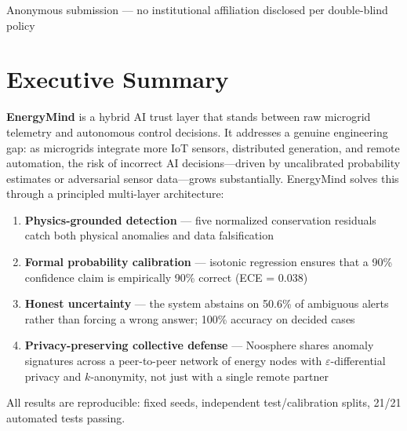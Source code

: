 \documentclass[12pt, a4paper]{article}
\begin{document}
\begin{titlepage}
\vfill
{\small\color{TextDark!50} Anonymous submission — no institutional affiliation disclosed per double-blind policy}
\end{titlepage}

\tableofcontents
\newpage

\section{Executive Summary}

\textbf{EnergyMind} is a hybrid AI trust layer that stands between raw microgrid telemetry and autonomous control decisions. It addresses a genuine engineering gap: as microgrids integrate more IoT sensors, distributed generation, and remote automation, the risk of incorrect AI decisions—driven by uncalibrated probability estimates or adversarial sensor data—grows substantially. EnergyMind solves this through a principled multi-layer architecture:

\begin{enumerate}[leftmargin=*, label=\textbf{\arabic*.}]
  \item \textbf{Physics-grounded detection} — five normalized conservation residuals catch both physical anomalies and data falsification
  \item \textbf{Formal probability calibration} — isotonic regression ensures that a 90\% confidence claim is empirically 90\% correct (ECE = 0.038)
  \item \textbf{Honest uncertainty} — the system abstains on 50.6\% of ambiguous alerts rather than forcing a wrong answer; 100\% accuracy on decided cases
  \item \textbf{Privacy-preserving collective defense} — Noosphere shares anomaly signatures across a peer-to-peer network of energy nodes with $\varepsilon$-differential privacy and $k$-anonymity, not just with a single remote partner
\end{enumerate}

All results are reproducible: fixed seeds, independent test/calibration splits, 21/21 automated tests passing.

\end{document}
